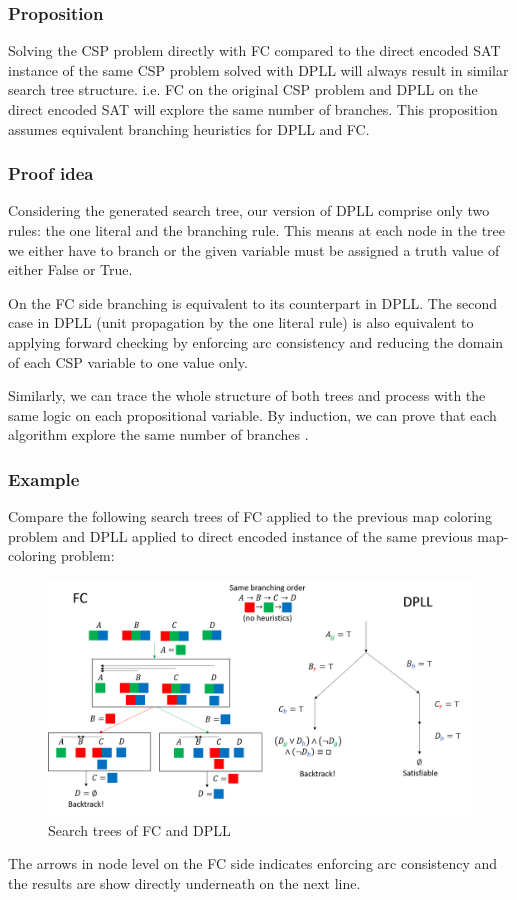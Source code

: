 \subsubsection{Proposition}
Solving the CSP problem directly with FC compared to the direct encoded SAT instance of the same CSP problem solved with DPLL will always result in similar search tree structure. i.e. FC on the original CSP problem and DPLL on the direct encoded SAT will explore the same number of branches. This proposition assumes equivalent branching heuristics for DPLL and FC.

\subsubsection{Proof idea}
Considering the generated search tree, our version of DPLL comprise only two rules: the one literal and the branching rule. This means at each node in the tree we either have to branch or the given variable must be assigned a truth value of either False or True. 

On the FC side branching is equivalent to its counterpart in DPLL. The second case in DPLL (unit propagation by the one literal rule) is also equivalent to applying forward checking by enforcing arc consistency and reducing the domain of each CSP variable to one value only.

Similarly, we can trace the whole structure of both trees and process with the same logic on each propositional variable. By induction, we can prove that each algorithm explore the same number of branches \cite{walsh2000sat}. 

\subsubsection{Example}
Compare the following search trees of FC applied to the previous map coloring problem and DPLL applied to direct encoded instance of the same previous map-coloring problem:
\begin{figure}[H]
	\centering
	\includegraphics[width=1\linewidth]{assets/direct_fc_vs_dpll}
	\captionsetup{justification=centering,margin=2cm}
	\caption{Search trees of FC and DPLL}
	\label{fig:direct_fc_vs_dpll}
\end{figure} 
The arrows in node level on the FC side indicates enforcing arc consistency and the results are show directly underneath on the next line.



